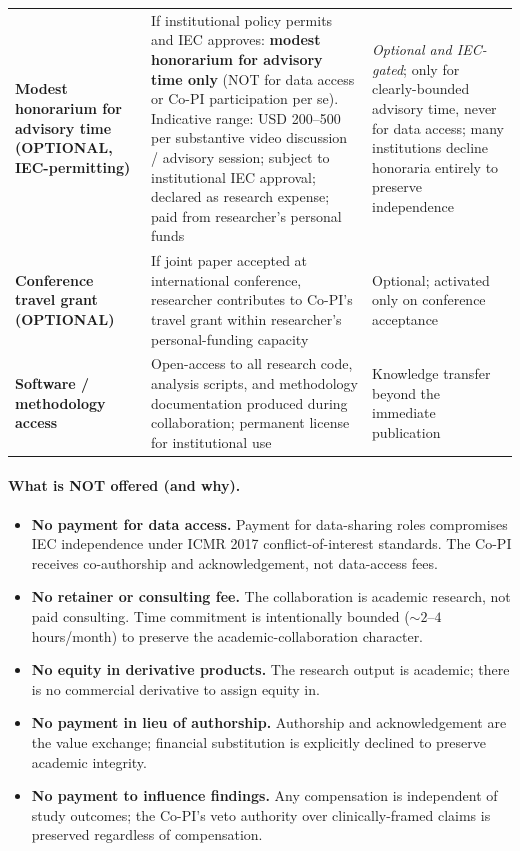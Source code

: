 {\begin{xltabular}{\textwidth}{@{} >{\raggedright\arraybackslash}p{3.0cm} p{6.7cm} p{4.6cm} @{}}
\textbf{Modest honorarium for advisory time (OPTIONAL, IEC-permitting)} & If institutional policy permits and IEC approves: \textbf{modest honorarium for advisory time only} (NOT for data access or Co-PI participation per se). Indicative range: USD 200--500 per substantive video discussion / advisory session; subject to institutional IEC approval; declared as research expense; paid from researcher's personal funds & \emph{Optional and IEC-gated}; only for clearly-bounded advisory time, never for data access; many institutions decline honoraria entirely to preserve independence \\
\textbf{Conference travel grant (OPTIONAL)} & If joint paper accepted at international conference, researcher contributes to Co-PI's travel grant within researcher's personal-funding capacity & Optional; activated only on conference acceptance \\
\textbf{Software / methodology access} & Open-access to all research code, analysis scripts, and methodology documentation produced during collaboration; permanent license for institutional use & Knowledge transfer beyond the immediate publication \\
\end{xltabular}}

\paragraph{What is NOT offered (and why).}
\begin{itemize}[leftmargin=*, itemsep=2pt]
    \item \textbf{No payment for data access.} Payment for data-sharing roles compromises IEC independence under ICMR 2017 conflict-of-interest standards. The Co-PI receives co-authorship and acknowledgement, not data-access fees.
    \item \textbf{No retainer or consulting fee.} The collaboration is academic research, not paid consulting. Time commitment is intentionally bounded ($\sim 2$--$4$ hours/month) to preserve the academic-collaboration character.
    \item \textbf{No equity in derivative products.} The research output is academic; there is no commercial derivative to assign equity in.
    \item \textbf{No payment in lieu of authorship.} Authorship and acknowledgement are the value exchange; financial substitution is explicitly declined to preserve academic integrity.
    \item \textbf{No payment to influence findings.} Any compensation is independent of study outcomes; the Co-PI's veto authority over clinically-framed claims is preserved regardless of compensation.
\end{itemize}


